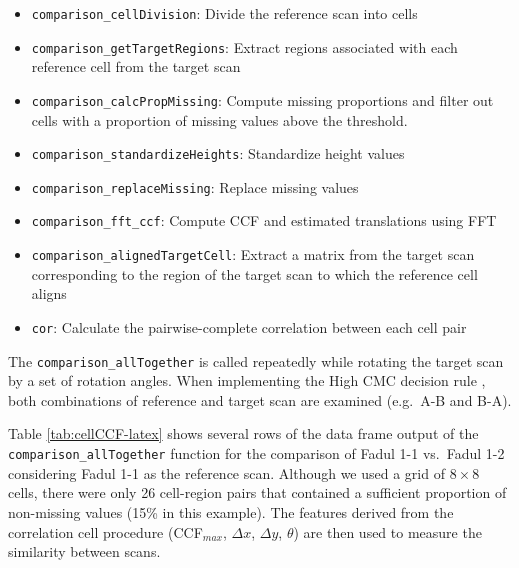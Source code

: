 \documentclass[11pt,]{isuthesis}
\providecommand{\tightlist}{%
  \setlength{\itemsep}{0pt}\setlength{\parskip}{0pt}}
\begin{document}
\begin{itemize}
\tightlist
\item
  \texttt{comparison\_cellDivision}: Divide the reference scan into cells
\item
  \texttt{comparison\_getTargetRegions}: Extract regions associated with each reference cell from the target scan
\item
  \texttt{comparison\_calcPropMissing}: Compute missing proportions and filter out cells with a proportion of missing values above the threshold.
\item
  \texttt{comparison\_standardizeHeights}: Standardize height values
\item
  \texttt{comparison\_replaceMissing}: Replace missing values
\item
  \texttt{comparison\_fft\_ccf}: Compute CCF and estimated translations using FFT
\item
  \texttt{comparison\_alignedTargetCell}: Extract a matrix from the target scan corresponding to the region of the target scan to which the reference cell aligns
\item
  \texttt{cor}: Calculate the pairwise-complete correlation between each cell pair
\end{itemize}

The \texttt{comparison\_allTogether} is called repeatedly while rotating the target scan by a set of rotation angles.
When implementing the High CMC decision rule \citep{tong_improved_2015}, both combinations of reference and target scan are examined (e.g.~A-B and B-A).

Table \ref{tab:cellCCF-latex} shows several rows of the data frame output of the \texttt{comparison\_allTogether} function for the comparison of Fadul 1-1 vs.~Fadul 1-2 considering Fadul 1-1 as the reference scan.
Although we used a grid of \(8 \times 8\) cells, there were only 26 cell-region pairs that contained a sufficient proportion of non-missing values (15\% in this example).
The features derived from the correlation cell procedure (CCF\(_{max}\), \(\Delta x\), \(\Delta y\), \(\theta\)) are then used to measure the similarity between scans.
\end{document}
